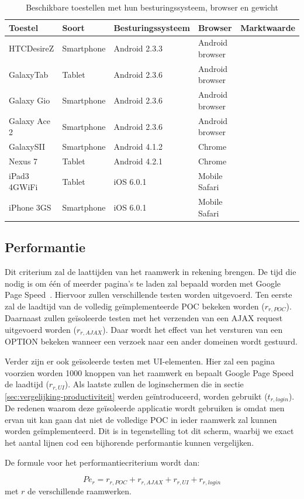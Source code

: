 \begin{table}[h]
  \centering
  \begin{tabular}{lllll}
    \toprule
    \textbf{Toestel} & \textbf{Soort} &\textbf{Besturingssysteem} & \textbf{Browser} & \textbf{Marktwaarde}\\
    \midrule
    HTCDesireZ & Smartphone & Android 2.3.3 & Android browser & \\
    GalaxyTab & Tablet & Android 2.3.6 & Android browser & \\
    Galaxy Gio & Smartphone & Android 2.3.6 & Android browser & \\
    Galaxy Ace 2 & Smartphone & Android 2.3.6 & Android browser & \\
    GalaxySII & Smartphone  & Android 4.1.2 & Chrome & \\
    Nexus 7 & Tablet & Android 4.2.1  & Chrome & \\
    iPad3 4GWiFi & Tablet & iOS 6.0.1 & Mobile Safari & \\
    iPhone 3GS & Smartphone & iOS 6.0.1 & Mobile Safari & \\
    \bottomrule
  \end{tabular}
  \caption{Beschikbare toestellen met hun besturingssysteem, browser en gewicht}
  \label{tabel:toestellen-hci}
\end{table}

\subsection{Performantie}
\label{sec:vergelijking-performantie}
Dit criterium zal de laattijden van het raamwerk in rekening brengen.
De tijd die nodig is om één of meerder pagina's te laden zal bepaald worden met Google Page Speed~\cite{Morgan2011}. 
Hiervoor zullen verschillende testen worden uitgevoerd. 
Ten eerste zal de laadtijd van de volledig geïmplementeerde POC bekeken worden ($r_{r,POC}$). 
Daarnaast zullen geïsoleerde testen met het verzenden van een AJAX request uitgevoerd worden ($r_{r,AJAX}$).
Daar wordt het effect van het versturen van een OPTION  bekeken wanneer een verzoek naar een ander domeinen wordt gestuurd.

Verder zijn er ook geïsoleerde testen met UI-elementen. 
Hier zal een  pagina voorzien worden 1000 knoppen van het raamwerk en bepaalt Google Page Speed de laadtijd ($r_{r,UI}$). 
Als laatste zullen de loginschermen die in sectie \ref{sec:vergelijking-productiviteit} werden geïntroduceerd, worden gebruikt ($t_{r,login}$). 
De redenen waarom deze geïsoleerde applicatie wordt gebruiken is omdat men ervan uit kan gaan dat niet de volledige POC in ieder raamwerk zal kunnen worden geïmplementeerd. 
Dit is in tegenstelling tot dit scherm, waarbij we exact het aantal lijnen cod een bijhorende performantie kunnen vergelijken.

De formule voor het performantiecriterium wordt dan: 

\begin{equation}
  Pe_r=r_{r,POC}+r_{r,AJAX}+r_{r,UI}+r_{r,login} 
  \label{eq:performantie}
\end{equation}
met $r$ de verschillende raamwerken.
